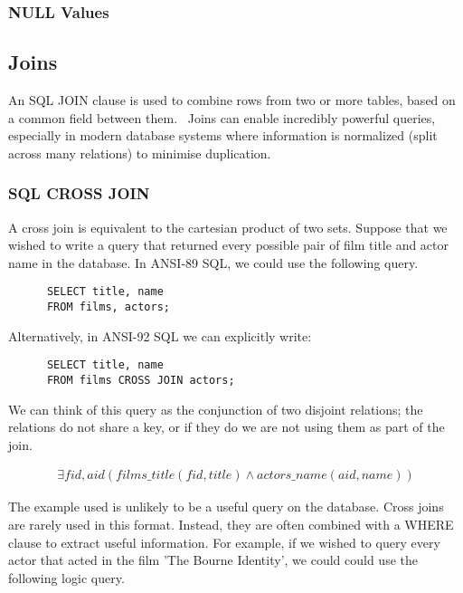 \documentclass[a4paper, 11pt]{article}
\begin{document}
    \subsubsection{NULL Values}


  \subsection{Joins}
    \label{sec:joins}

    An SQL JOIN clause is used to combine rows from two or more tables, based
    on a common field between them.~\cite{w3JOINS} Joins can enable incredibly
    powerful queries, especially in modern database systems where information
    is normalized (split across many relations) to minimise duplication.

    \subsubsection{SQL CROSS JOIN}

      A cross join is equivalent to the cartesian product of two sets. Suppose
      that we wished to write a query that returned every possible pair of
      film title and actor name in the database. In ANSI-89 SQL, we could use 
      the following query.

      \begin{verbatim}
      SELECT title, name
      FROM films, actors;
      \end{verbatim}

      Alternatively, in ANSI-92 SQL we can explicitly write:

      \begin{verbatim}
      SELECT title, name
      FROM films CROSS JOIN actors;
      \end{verbatim}

      We can think of this query as the conjunction of two disjoint relations;
      the relations do not share a key, or if they do we are not using them as
      part of the join.

      \begin{gather}
        \exists fid, aid(films\_title(fid, title) \land actors\_name(aid, name))
      \end{gather}

      The example used is unlikely to be a useful query on the database. Cross
      joins are rarely used in this format. Instead, they are often combined
      with a WHERE clause to extract useful information. For example, if we
      wished to query every actor that acted in the film 'The Bourne Identity',
      we could could use the following logic query.
\end{document}
